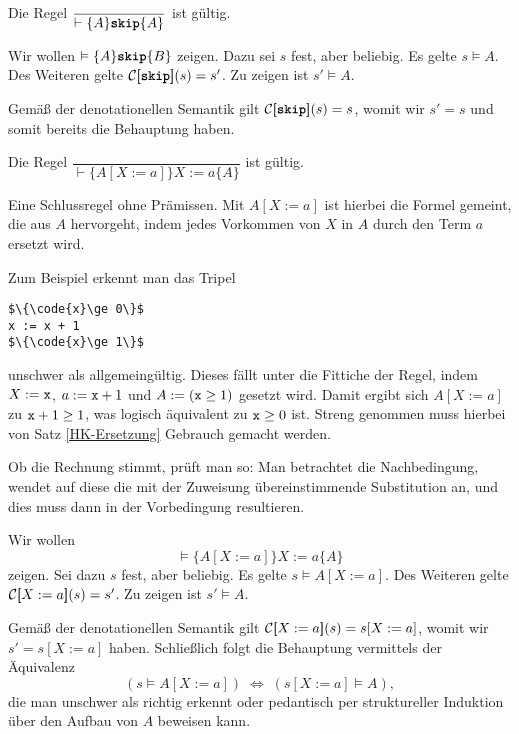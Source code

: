 \begin{Satz}\newlinefirst
Die Regel $\dfrac{}{\vdash\{A\}\kw{skip}\{A\}}$ ist gültig.
\end{Satz}
\begin{Beweis}
Wir wollen $\models\{A\}\kw{skip}\{B\}$ zeigen.
Dazu sei $s$ fest, aber beliebig. Es gelte $s\models A$. Des Weiteren
gelte $\evC\qb{\kw{skip}}(s)=s'$. Zu zeigen ist $s'\models A$.

Gemäß der denotationellen Semantik gilt $\evC\qb{\kw{skip}}(s)=s$, womit
wir $s'=s$ und somit bereits die Behauptung haben.\,\qedsymbol
\end{Beweis}

\begin{Satz}\newlinefirst
Die Regel $\dfrac{}{\vdash\{A[X:=a]\}X:=a\{A\}}$ ist gültig.
\end{Satz}
Eine Schlussregel ohne Prämissen. Mit $A[X:=a]$ ist hierbei die
Formel gemeint, die aus $A$ hervorgeht, indem jedes Vorkommen von
$X$ in $A$ durch den Term $a$ ersetzt wird.

Zum Beispiel erkennt man das Tripel
\begin{lstlisting}[language=IMP, xleftmargin=\mathindent, mathescape]
$\{\code{x}\ge 0\}$
x := x + 1
$\{\code{x}\ge 1\}$
\end{lstlisting}
unschwer als allgemeingültig. Dieses fällt unter die Fittiche der
Regel, indem $X:=\texttt{x}$, $a:=\texttt{x}+1$ und $A:=(\texttt{x}\ge 1)$
gesetzt wird. Damit ergibt sich $A[X:=a]$ zu $\texttt{x} + 1\ge 1$,
was logisch äquivalent zu $\texttt{x}\ge 0$ ist. Streng genommen muss
hierbei von Satz \ref{HK-Ersetzung} Gebrauch gemacht werden.

Ob die Rechnung stimmt, prüft man so: Man betrachtet die Nachbedingung,
wendet auf diese die mit der Zuweisung übereinstimmende Substitution an,
und dies muss dann in der Vorbedingung resultieren.

\begin{Beweis}
Wir wollen
\[\models\{A[X:=a]\}X:=a\{A\}\]
zeigen. Sei dazu $s$ fest, aber beliebig. Es gelte $s\models A[X:=a]$.
Des Weiteren gelte $\mathcal C[\hspace{-2.6pt}[X:=a]\hspace{-2.4pt}](s)=s'$. Zu zeigen ist $s'\models A$.

Gemäß der denotationellen Semantik gilt $\mathcal C[\hspace{-2.6pt}[X:=a]\hspace{-2.4pt}](s)=s[X:=a]$, womit
wir $s'=s[X:=a]$ haben. Schließlich folgt die Behauptung vermittels
der Äquivalenz
\[(s\models A[X:=a])\;\Leftrightarrow\; (s[X:=a]\models A),\]
die man unschwer als richtig erkennt oder pedantisch per struktureller
Induktion über den Aufbau von $A$ beweisen kann.\,\qedsymbol
\end{Beweis}


